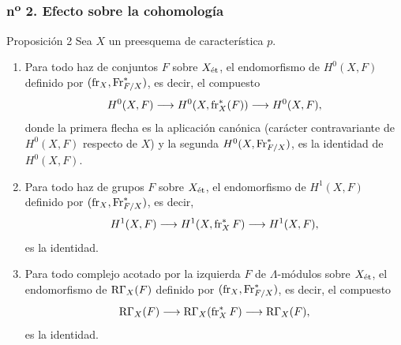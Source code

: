 \subsubsection*{n\textsuperscript{o} 2. Efecto sobre la cohomología}

\begin{statement}{Proposición 2}
Sea $X$ un preesquema de característica $p$.
\begin{enumerate}[label=\alph*)]
\item Para todo haz de conjuntos $F$ sobre $X_{\mathrm{\acute{e}t}}$, el endomorfismo de $H^0(X,F)$ definido por $(\operatorname{fr}_X,\operatorname{Fr}^*_{F/X})$, es decir, el compuesto
\[
H^0(X,F)\longrightarrow H^0(X,\operatorname{fr}_X^*(F))\longrightarrow H^0(X,F),
\]
donde la primera flecha es la aplicación canónica (carácter contravariante de $H^0(X,F)$ respecto de $X$) y la segunda $H^0(X,\operatorname{Fr}^*_{F/X})$, es la identidad de $H^0(X,F)$.
\item Para todo haz de grupos $F$ sobre $X_{\mathrm{\acute{e}t}}$, el endomorfismo de $H^1(X,F)$ definido por $(\operatorname{fr}_X,\operatorname{Fr}^*_{F/X})$, es decir,
\[
H^1(X,F)\longrightarrow H^1(X,\operatorname{fr}_X^*F)\longrightarrow H^1(X,F),
\]
es la identidad.
\item Para todo complejo acotado por la izquierda $F$ de $\Lambda$-módulos sobre $X_{\mathrm{\acute{e}t}}$, el endomorfismo de $\mathrm R\Gamma_X(F)$ definido por $(\operatorname{fr}_X,\operatorname{Fr}^*_{F/X})$, es decir, el compuesto
\[
\mathrm R\Gamma_X(F)\longrightarrow \mathrm R\Gamma_X(\operatorname{fr}_X^*F)\longrightarrow \mathrm R\Gamma_X(F),
\]
es la identidad.
\end{enumerate}
\end{statement}
